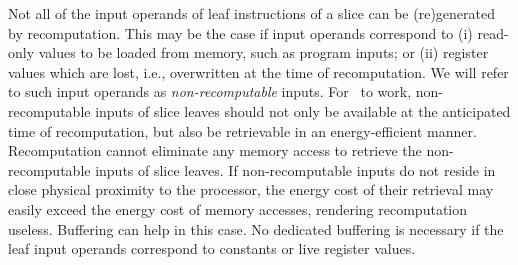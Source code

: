 Not all of the input operands of leaf instructions of a slice can be
(re)generated by recomputation.  This may be the case if input operands
correspond to (i) read-only values to be loaded from memory, such as program
inputs; or (ii) register values which are lost, i.e., overwritten at the time of
recomputation. We will refer to such input operands as {\em non-recomputable}
inputs. For \recomp\ to work, non-recomputable inputs of slice leaves
should not only be available at the anticipated time of recomputation, but also
be retrievable in an energy-efficient manner.
%
Recomputation cannot eliminate any memory access to retrieve the
non-recomputable inputs of slice leaves.  If non-recomputable inputs do not
reside in close physical proximity to the processor, the energy cost of their
retrieval may easily exceed the energy cost of memory accesses, rendering recomputation useless.    
Buffering can help in this case. No dedicated buffering is necessary if the leaf input operands
correspond to constants or live register values. 

